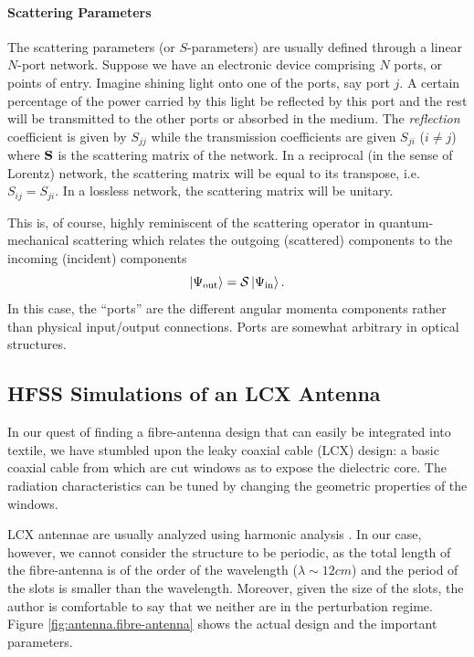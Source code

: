 \paragraph{Scattering Parameters}
The scattering parameters (or $S$-parameters) are
usually defined through a linear $N$-port network. 
Suppose we have an electronic device comprising
$N$ ports, or points of entry. Imagine shining light onto
one of the ports, say port $j$. A certain percentage
of the power carried by this light be reflected 
by this port and the rest will be transmitted to the
other ports or absorbed in the medium. The \textit{reflection}
coefficient is given by $S_{jj}$ while the transmission
coefficients are given $S_{ji}$ ($i\neq j$) where $\mathbf{S}$
is the scattering matrix of the network. In a reciprocal (in the sense
of Lorentz) network, the scattering matrix will be equal to its
transpose, i.e. $S_{ij}=S_{ji}$. In a lossless network, the scattering
matrix will be unitary. 

This is, of course, highly reminiscent of the scattering operator
in quantum-mechanical scattering which relates the outgoing (scattered)
components to the incoming (incident) components
  \begin{equation}
   \Ket{\Psi_\text{out}}=\mathcal{S}\Ket{\Psi_\text{in}}.
  \end{equation}
In this case, the ``ports'' are the different angular momenta
components rather than physical input/output connections. 
Ports are somewhat arbitrary in optical structures.

\subsection{HFSS Simulations of an LCX Antenna}
In our quest of finding a fibre-antenna design that can easily be integrated into
textile, we have stumbled upon the leaky coaxial cable (LCX) design: a basic coaxial cable
from which are cut windows as to expose the dielectric core. The radiation characteristics
can be tuned by changing the geometric properties of the windows. 

LCX antennae are usually analyzed using harmonic analysis \cite{WAN2001}. 
In our case, however, we cannot consider the structure to be periodic, as the total 
length of the fibre-antenna is of the order of the wavelength ($\lambda\sim12\unit{cm}$) and the period
of the slots is smaller than the wavelength. Moreover, given the size of the slots, 
the author is comfortable to say that we neither are in the perturbation regime. 
Figure \ref{fig:antenna.fibre-antenna} shows the actual design and the important parameters.

